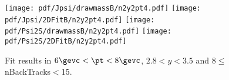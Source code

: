 \begin{figure}[H]
\begin{center}
\texttt{[image: pdf/Jpsi/drawmassB/n2y2pt4.pdf]}
\texttt{[image: pdf/Jpsi/2DFitB/n2y2pt4.pdf]}
\vspace*{-0.5cm}
\texttt{[image: pdf/Psi2S/drawmassB/n2y2pt4.pdf]}
\texttt{[image: pdf/Psi2S/2DFitB/n2y2pt4.pdf]}
\vspace*{-0.5cm}
\end{center}
\caption{Fit results in $6\gevc<\pt<8\gevc$, $2.8<y<3.5$ and 8$\leq$nBackTracks$<$15.}
\label{Fitn2y2pt4}
\end{figure}
